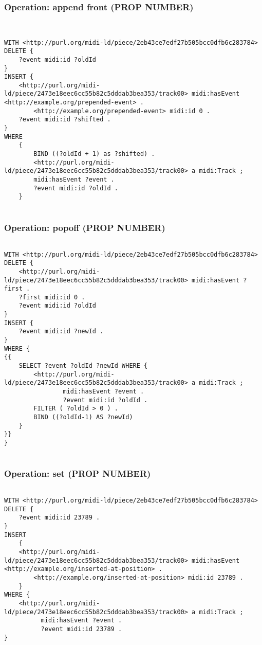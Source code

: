 \subsubsection{Operation: append front (PROP NUMBER)}
\label{query:PROP\-NUMBER:append_front}

\begin{lstlisting}[language=sparql]


WITH <http://purl.org/midi-ld/piece/2eb43ce7edf27b505bcc0dfb6c283784>
DELETE {
	?event midi:id ?oldId
}
INSERT {
    <http://purl.org/midi-ld/piece/2473e18eec6cc55b82c5dddab3bea353/track00> midi:hasEvent <http://example.org/prepended-event> .
		<http://example.org/prepended-event> midi:id 0 .
	?event midi:id ?shifted .
}
WHERE
	{
		BIND ((?oldId + 1) as ?shifted) .
		<http://purl.org/midi-ld/piece/2473e18eec6cc55b82c5dddab3bea353/track00> a midi:Track ;
		midi:hasEvent ?event .
		?event midi:id ?oldId .
	}


\end{lstlisting}

\subsubsection{Operation: popoff (PROP NUMBER)}
\label{query:PROP\-NUMBER:popoff}

\begin{lstlisting}[language=sparql]

WITH <http://purl.org/midi-ld/piece/2eb43ce7edf27b505bcc0dfb6c283784>
DELETE {
	<http://purl.org/midi-ld/piece/2473e18eec6cc55b82c5dddab3bea353/track00> midi:hasEvent ?first .
	?first midi:id 0 .
	?event midi:id ?oldId
}
INSERT {
	?event midi:id ?newId .
}
WHERE {
{{
	SELECT ?event ?oldId ?newId WHERE {
		<http://purl.org/midi-ld/piece/2473e18eec6cc55b82c5dddab3bea353/track00> a midi:Track ;
				midi:hasEvent ?event .
				?event midi:id ?oldId .
		FILTER ( ?oldId > 0 ) .
		BIND ((?oldId-1) AS ?newId)
	}
}}
}


\end{lstlisting}

\subsubsection{Operation: set (PROP NUMBER)}
\label{query:PROP\-NUMBER:set}

\begin{lstlisting}[language=sparql]

WITH <http://purl.org/midi-ld/piece/2eb43ce7edf27b505bcc0dfb6c283784>
DELETE {
	?event midi:id 23789 .
}
INSERT
	{
    <http://purl.org/midi-ld/piece/2473e18eec6cc55b82c5dddab3bea353/track00> midi:hasEvent <http://example.org/inserted-at-position> .
		<http://example.org/inserted-at-position> midi:id 23789 .
	}
WHERE {
    <http://purl.org/midi-ld/piece/2473e18eec6cc55b82c5dddab3bea353/track00> a midi:Track ;
          midi:hasEvent ?event .
		  ?event midi:id 23789 .
}


\end{lstlisting}


